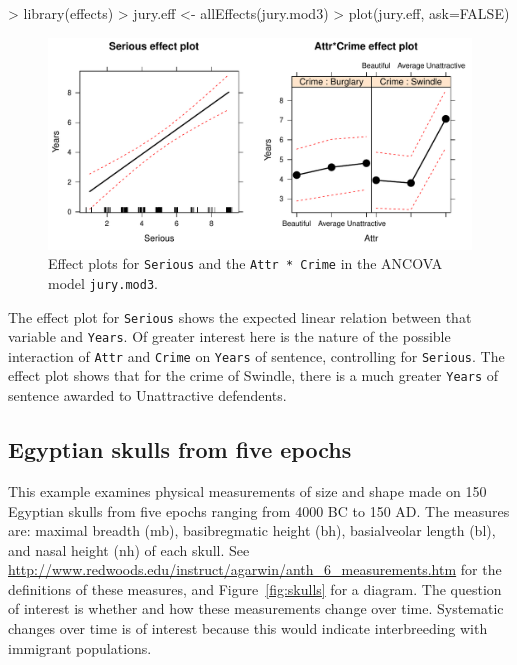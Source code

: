 \documentclass[11pt]{article}
\newcommand{\figref}[1]{Figure~\ref{#1}}
\newcommand{\code}[1]{{\texttt{#1}}}
\begin{document}
\begin{Schunk}
\begin{Sinput}
> library(effects)
> jury.eff <- allEffects(jury.mod3)
> plot(jury.eff, ask=FALSE)
\end{Sinput}
\end{Schunk}

\begin{figure}[htb!] %
\begin{center}
	\includegraphics[width=\textwidth]{fig/plot-jury-mod3-eff}
\caption{Effect plots for  \code{Serious} and the \code{Attr * Crime}
	 in the ANCOVA model \code{jury.mod3}.}
\label{fig:jury-mod3-eff}
\end{center}
\end{figure}

The effect plot for \code{Serious} shows the expected linear relation
between that variable and \code{Years}. Of greater interest here is the nature
of the possible interaction of \code{Attr} and \code{Crime} on \code{Years}
of sentence, controlling for \code{Serious}.
The effect plot shows that for the crime of Swindle, there is a much
greater \code{Years} of sentence awarded to Unattractive defendents.

\subsection[Egyptian skulls]{Egyptian skulls from five epochs}
This example examines physical measurements of size and shape made on
150 Egyptian skulls from five epochs ranging from
4000 BC to 150 AD.
The measures are: maximal breadth (mb), basibregmatic height (bh),
basialveolar length (bl), and nasal height (nh) of each skull.
See \url{http://www.redwoods.edu/instruct/agarwin/anth_6_measurements.htm}
for the definitions of these measures, and \figref{fig:skulls} for a diagram.
The question of interest is whether and how these measurements change over time.
Systematic changes over time is of interest because this
would indicate interbreeding with immigrant populations.
\end{document}
